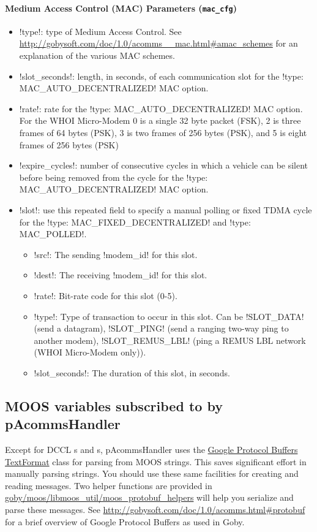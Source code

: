 \paragraph{Medium Access Control (MAC) Parameters (\texttt{mac\_cfg})}
\begin{itemize}
\item !type!: type of Medium Access Control. See \url{http://gobysoft.com/doc/1.0/acomms__mac.html#amac_schemes} for an explanation of the various MAC schemes.
\item !slot_seconds!: length, in seconds, of each communication slot for the !type: MAC_AUTO_DECENTRALIZED! MAC option.
\item !rate!: rate for the !type: MAC_AUTO_DECENTRALIZED! MAC option. For the WHOI Micro-Modem 0 is a single 32 byte packet (FSK), 2 is three frames of 64 bytes (PSK), 3 is two frames of 256 bytes (PSK), and 5 is eight frames of 256 bytes (PSK)
\item !expire_cycles!: number of consecutive cycles in which a vehicle can be silent before being removed from the cycle for the !type: MAC_AUTO_DECENTRALIZED! MAC option.
\item !slot!: use this repeated field to specify a manual polling or fixed TDMA cycle for the  !type: MAC_FIXED_DECENTRALIZED! and  !type: MAC_POLLED!. 
\begin{itemize}
\item !src!: The sending !modem_id! for this slot.
\item !dest!: The receiving !modem_id! for this slot.
\item !rate!: Bit-rate code for this slot (0-5).
\item !type!: Type of transaction to occur in this slot. Can be !SLOT_DATA! (send a datagram), !SLOT_PING! (send a ranging two-way ping to another modem), !SLOT_REMUS_LBL! (ping a REMUS LBL network (WHOI Micro-Modem only)).
\item !slot_seconds!: The duration of this slot, in seconds.
\end{itemize} 
\end{itemize} 

\subsection{MOOS variables subscribed to by pAcommsHandler}

Except for DCCL s and s, pAcommsHandler uses the \href{http://code.google.com/apis/protocolbuffers/docs/reference/cpp/google.protobuf.text_format.html}{Google Protocol Buffers TextFormat} class for parsing from MOOS strings. This saves significant effort in manually parsing strings. You should use these same facilities for creating and reading messages. Two helper functions are provided in \\ \href{http://gobysoft.com/doc/1.0/moos__protobuf__helpers_8h.html}{goby/moos/libmoos\_util/moos\_protobuf\_helpers} will help you serialize and parse these messages. See \url{http://gobysoft.com/doc/1.0/acomms.html#protobuf} for a brief overview of Google Protocol Buffers as used in Goby.

